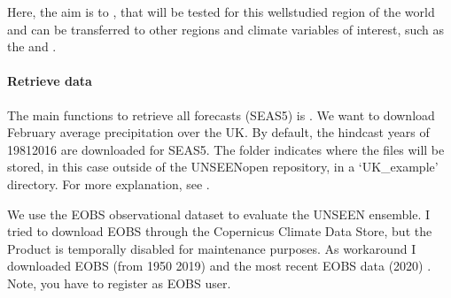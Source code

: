 \documentclass[letterpaper,10pt,english]{sphinxmanual}
\begin{document}
Here, the aim is to , that will be tested for this well\sphinxhyphen{}studied region of the world and can be transferred to other regions and climate variables of interest, such as the  and .


\paragraph{Retrieve data}
\label{\detokenize{Notebooks/examples/UK_Precipitation:Retrieve-data}}
The main functions to retrieve all forecasts (SEAS5) is . We want to download February average precipitation over the UK. By default, the hindcast years of 1981\sphinxhyphen{}2016 are downloaded for SEAS5. The folder indicates where the files will be stored, in this case outside of the UNSEEN\sphinxhyphen{}open repository, in a ‘UK\_example’ directory. For more explanation, see .

{
\begin{sphinxVerbatim}[commandchars=\\\{\}]
\llap{\color{nbsphinxin}[ ]:\,\hspace{\fboxrule}\hspace{\fboxsep}}  
                          \PYG{p}{[}\PYG{p}{]}
                          \PYG{p}{[}   \PYG{p}{]}
                          
\end{sphinxVerbatim}
}

We use the EOBS observational dataset to evaluate the UNSEEN ensemble. I tried to download EOBS through the Copernicus Climate Data Store, but the Product is temporally disabled for maintenance purposes. As workaround I downloaded EOBS (from 1950 \sphinxhyphen{} 2019) and the most recent EOBS data (2020) . Note, you have to register as E\sphinxhyphen{}OBS user.
\end{document}
